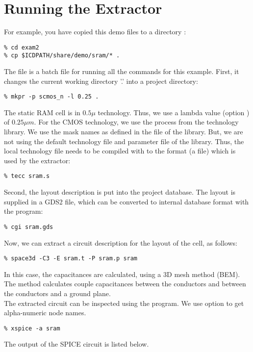 \section{Running the Extractor}
For example, you have copied this demo files to a directory :
\small
\begin{Verbatim}
% cd exam2
% cp $ICDPATH/share/demo/sram/* .
\end{Verbatim}
\normalsize
The file  is a batch file for running all the commands
for this example.
First, it changes the current working directory '.' into a project directory:
\small
\begin{Verbatim}
% mkpr -p scmos_n -l 0.25 .
\end{Verbatim}
\normalsize
The static RAM cell is in $0.5 \mu$ technology.
Thus, we use a lambda value (option ) of $0.25 \mu m$.
For the CMOS technology, we use the  process from the technology library.
We use the mask names as defined in the  file of the library.
But, we are not using the default technology
file  and parameter file  of the library.
Thus, the local technology file  needs to be compiled with  to the format
(a  file) which is used by the extractor:
\small
\begin{Verbatim}
% tecc sram.s
\end{Verbatim}
\normalsize
Second, the layout description is put into the project database.
The layout is supplied in a GDS2 file, which can be converted to
internal database format with the  program:
\small
\begin{Verbatim}
% cgi sram.gds
\end{Verbatim}
\normalsize
Now, we can extract a circuit description for the layout of the  cell, as follows:
\small
\begin{Verbatim}
% space3d -C3 -E sram.t -P sram.p sram
\end{Verbatim}
\normalsize
In this case, the capacitances are calculated, using a 3D mesh method (BEM).
The method calculates couple capacitances between the conductors and between the conductors
and a ground plane.
\\[1 ex]
The extracted circuit can be inspected using the  program.
We use option  to get alpha-numeric node names.
\small
\begin{Verbatim}
% xspice -a sram
\end{Verbatim}
\normalsize
The output of the SPICE circuit is listed below.

